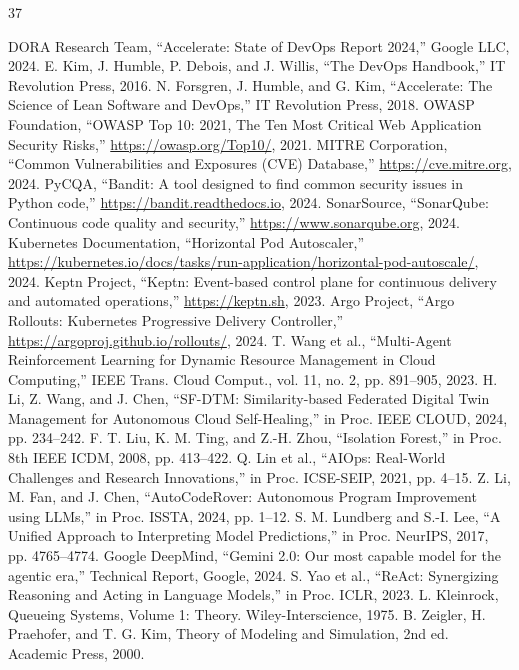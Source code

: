 \documentclass[10pt,conference]{IEEEtran}
\begin{document}
\renewcommand{\IEEEbibitemsep}{0.5pt plus 0.5pt}\begin{thebibliography}{37}

 DORA Research Team, ``Accelerate: State of DevOps Report 2024,'' Google LLC, 2024.
 E. Kim, J. Humble, P. Debois, and J. Willis, ``The DevOps Handbook,'' IT Revolution Press, 2016.
 N. Forsgren, J. Humble, and G. Kim, ``Accelerate: The Science of Lean Software and DevOps,'' IT Revolution Press, 2018.
 OWASP Foundation, ``OWASP Top 10: 2021, The Ten Most Critical Web Application Security Risks,'' \url{https://owasp.org/Top10/}, 2021.
 MITRE Corporation, ``Common Vulnerabilities and Exposures (CVE) Database,'' \url{https://cve.mitre.org}, 2024.
 PyCQA, ``Bandit: A tool designed to find common security issues in Python code,'' \url{https://bandit.readthedocs.io}, 2024.
 SonarSource, ``SonarQube: Continuous code quality and security,'' \url{https://www.sonarqube.org}, 2024.
 Kubernetes Documentation, ``Horizontal Pod Autoscaler,'' \url{https://kubernetes.io/docs/tasks/run-application/horizontal-pod-autoscale/}, 2024.
 Keptn Project, ``Keptn: Event-based control plane for continuous delivery and automated operations,'' \url{https://keptn.sh}, 2023.
 Argo Project, ``Argo Rollouts: Kubernetes Progressive Delivery Controller,'' \url{https://argoproj.github.io/rollouts/}, 2024.
 T. Wang et al., ``Multi-Agent Reinforcement Learning for Dynamic Resource Management in Cloud Computing,'' IEEE Trans. Cloud Comput., vol. 11, no. 2, pp. 891--905, 2023.
 H. Li, Z. Wang, and J. Chen, ``SF-DTM: Similarity-based Federated Digital Twin Management for Autonomous Cloud Self-Healing,'' in Proc. IEEE CLOUD, 2024, pp. 234--242.
 F. T. Liu, K. M. Ting, and Z.-H. Zhou, ``Isolation Forest,'' in Proc. 8th IEEE ICDM, 2008, pp. 413--422.
 Q. Lin et al., ``AIOps: Real-World Challenges and Research Innovations,'' in Proc. ICSE-SEIP, 2021, pp. 4--15.
 Z. Li, M. Fan, and J. Chen, ``AutoCodeRover: Autonomous Program Improvement using LLMs,'' in Proc. ISSTA, 2024, pp. 1--12.
 S. M. Lundberg and S.-I. Lee, ``A Unified Approach to Interpreting Model Predictions,'' in Proc. NeurIPS, 2017, pp. 4765--4774.
 Google DeepMind, ``Gemini 2.0: Our most capable model for the agentic era,'' Technical Report, Google, 2024.
 S. Yao et al., ``ReAct: Synergizing Reasoning and Acting in Language Models,'' in Proc. ICLR, 2023.
 L. Kleinrock, Queueing Systems, Volume 1: Theory. Wiley-Interscience, 1975.
 B. Zeigler, H. Praehofer, and T. G. Kim, Theory of Modeling and Simulation, 2nd ed. Academic Press, 2000.


\end{thebibliography}
\end{document}
